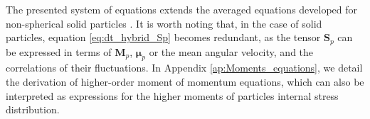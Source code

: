 The presented system of equations extends the averaged equations developed for non-spherical solid particles \citep{curtiss1956kinetic}. 
It is worth noting that, in the case of solid particles, equation \ref{eq:dt_hybrid_Sp} becomes redundant, as the tensor $\textbf{S}_p$ can be expressed in terms of $\textbf{M}_p$, $\bm{\mu}_p$ or the mean angular velocity, and the correlations of their fluctuations.
In Appendix \ref{ap:Moments_equations}, we detail the derivation of higher-order moment of momentum equations, which can also be interpreted as expressions for the higher moments of particles internal stress distribution. 
